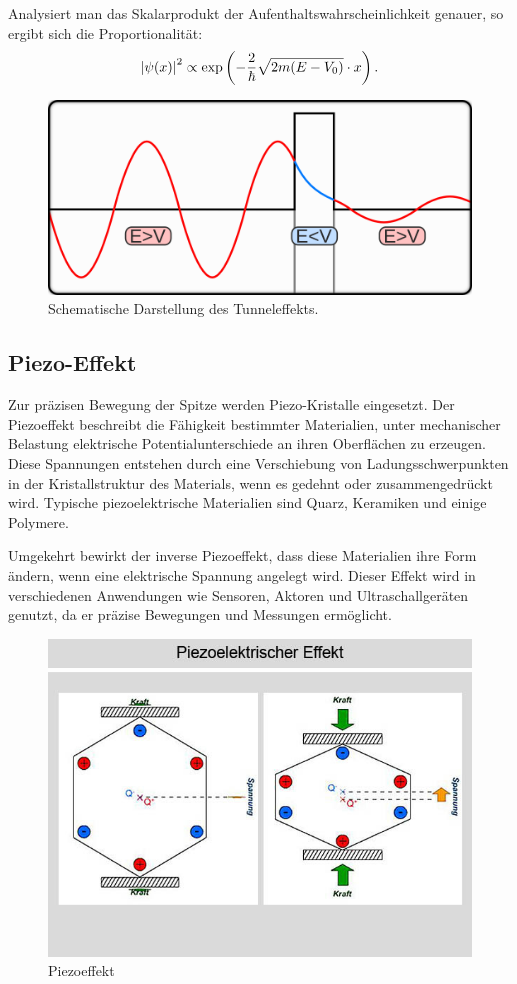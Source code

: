 \documentclass{article}
\begin{document}
Analysiert man das Skalarprodukt der Aufenthaltswahrscheinlichkeit genauer, so ergibt sich die Proportionalität:
\begin{align*}
    \abs{\psi(x)}^2 \propto \exp\left(-\frac{2}{\hbar} \sqrt{2m (E - V_0)} \cdot x\right).
\end{align*}

\begin{figure}[h!]
    \centering
    \includegraphics[width=0.5\linewidth]{figure/tunneleffekt.png}
    \caption{Schematische Darstellung des Tunneleffekts.}
    \label{fig:tunneleffekt}
\end{figure}

\subsection*{Piezo-Effekt}
Zur präzisen Bewegung der Spitze werden Piezo-Kristalle eingesetzt. 
Der Piezoeffekt beschreibt die Fähigkeit bestimmter Materialien, unter mechanischer Belastung elektrische Potentialunterschiede an ihren Oberflächen zu erzeugen.
Diese Spannungen entstehen durch eine Verschiebung von Ladungsschwerpunkten in der Kristallstruktur des Materials, wenn es gedehnt oder zusammengedrückt wird.
Typische piezoelektrische Materialien sind Quarz, Keramiken und einige Polymere.

Umgekehrt bewirkt der inverse Piezoeffekt, dass diese Materialien ihre Form ändern, wenn eine elektrische Spannung angelegt wird.
Dieser Effekt wird in verschiedenen Anwendungen wie Sensoren, Aktoren und Ultraschallgeräten genutzt, da er präzise Bewegungen und Messungen ermöglicht.

\begin{figure}[h!]
    \centering
    \includegraphics[width=0.5\linewidth]{figure/piezo_effekt.jpg}
    \caption{Piezoeffekt}
    \label{fig:piezoelektrische}
\end{figure}
\end{document}
